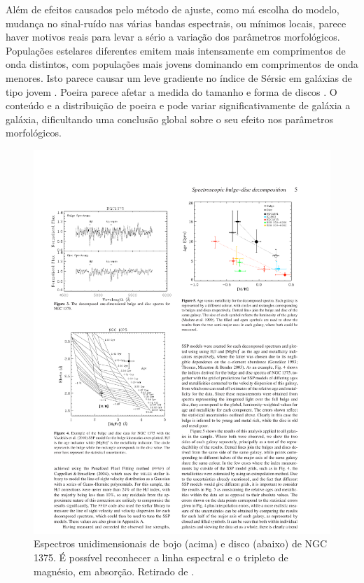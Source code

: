 Além de efeitos causados pelo método de ajuste, como má escolha do modelo,
mudança no sinal-ruído nas várias bandas espectrais, ou mínimos locais, parece haver
motivos reais para levar a sério a variação dos parâmetros morfológicos.
Populações estelares diferentes emitem mais intensamente em comprimentos de onda
distintos, com populações mais jovens dominando em comprimentos de onda menores.
Isto parece causar um leve gradiente no índice de Sérsic em galáxias de tipo
jovem \citep{LaBarbera2009}. Poeira parece afetar a medida do tamanho e forma de
discos \citep{Mollenhoff2006}. O conteúdo e a distribuição de poeira e pode
variar significativamente de galáxia a galáxia, dificultando uma conclusão
global sobre o seu efeito nos parâmetros morfológicos.

\begin{figure}
	\includegraphics{figuras/johnston-spectra}
	\caption[Espectros das componentes morfológicas.] {Espectros unidimensionais de
	bojo (acima) e disco (abaixo) de NGC 1375. É possível reconhecer a
	linha espectral \Hbeta e o tripleto de magnésio, em absorção. Retirado de
	\citet{Johnston2012}.}
	\label{fig:spectraJohnston}
\end{figure}

